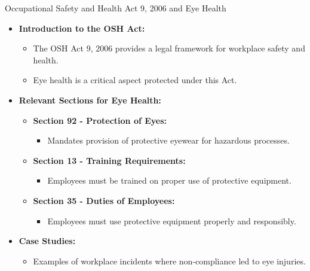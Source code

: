 \begin{frame}[plain, shrink=25]{Occupational Safety and Health Act 9, 2006 and Eye Health}
    \begin{multicols}{2}

        \begin{itemize}
            \item \textbf{Introduction to the OSH Act:}
            \begin{itemize}
                \item The OSH Act 9, 2006 provides a legal framework for workplace safety and health.
                \item Eye health is a critical aspect protected under this Act.
            \end{itemize}
            
            \item \textbf{Relevant Sections for Eye Health:}
            \begin{itemize}
                \item \textbf{Section 92 - Protection of Eyes:} 
                \begin{itemize}
                    \item Mandates provision of protective eyewear for hazardous processes.
                \end{itemize}
                \item \textbf{Section 13 - Training Requirements:} 
                \begin{itemize}
                    \item Employees must be trained on proper use of protective equipment.
                \end{itemize}
                \item \textbf{Section 35 - Duties of Employees:} 
                \begin{itemize}
                    \item Employees must use protective equipment properly and responsibly.
                \end{itemize}
            \end{itemize}
    
            \item \textbf{Case Studies:}
            \begin{itemize}
                \item Examples of workplace incidents where non-compliance led to eye injuries.
            \end{itemize}
            

\end{itemize}
\end{multicols}
\end{frame}
